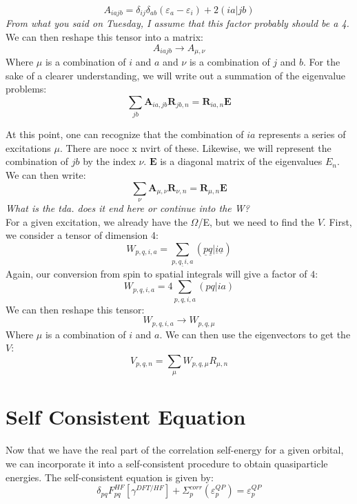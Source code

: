 \documentclass[12pt]{article}
\begin{document}
\begin{equation}
    A_{iajb}=\delta _{ij} \delta _{ab} \left(\varepsilon _{a}-\varepsilon _{i}\right) + 2(ia|jb)
\end{equation}
\emph{From what you said on Tuesday, I assume that this factor probably should be a 4.\\}We can then reshape this tensor into a matrix:
\begin{equation}
    A_{iajb} \rightarrow A_{\mu ,\nu }
\end{equation}
Where $\mu$ is a combination of $i$ and $a$ and $\nu$ is a combination of $j$ and $b$.
For the sake of a clearer understanding, we will write out a summation of the eigenvalue problems:
\begin{equation}
    \sum_{jb} \textbf{A}_{ia,jb} \textbf{R}_{jb,n} = \textbf{R}_{ia,n} \textbf{E}
\end{equation}


At this point, one can recognize that the combination of $ia$ represents a series of excitations $\mu $. There are nocc x nvirt of these. Likewise, we will represent the combination of $jb$ by the index $\nu $. $\textbf{E}$ is a diagonal matrix of the eigenvalues $E_{n}$. We can then write:
\begin{equation}
    \sum_{\nu} \textbf{A}_{\mu ,\nu } \textbf{R}_{\nu, n} = \textbf{R}_{\mu ,n} \textbf{E}
\end{equation}
\emph{What is the tda. does it end here or continue into the W?\\}
For a given excitation, we already have the $\Omega $/E, but we need to find the $V$.
First, we consider a tensor of dimension 4:
\begin{equation}
    W_{p,q,i,a} = \sum_{\underline{p,q,i,a}} (\underline{p} \underline{q} | \underline{i} \underline{a} )
\end{equation}
Again, our conversion from spin to spatial integrals will give a factor of $4$:
\begin{equation}
    W_{p,q,i,a} = 4 \sum_{p,q,i,a} (pq|ia)
\end{equation}
We can then reshape this tensor:
\begin{equation}
    W_{p,q,i,a} \rightarrow W_{p,q, \mu }
\end{equation}
Where $\mu$ is a combination of $i$ and $a$. We can then use the eigenvectors to get the $V$:
\begin{equation}
    V_{p,q,n} = \sum_{\mu } W_{p,q,\mu } R_{\mu ,n }
\end{equation}
\section{Self Consistent Equation}
Now that we have the real part of the correlation self-energy for a given orbital, we can incorporate it into a self-consistent procedure to obtain quasiparticle energies. The self-consistent equation is given by:
\begin{equation}
    \delta_{pq}F_{pq}^{HF}[\gamma^{DFT/HF }] + \Sigma_{p}^{corr}(\varepsilon_{p}^{QP}) = \varepsilon_{p}^{QP}
\end{equation}
\end{document}
